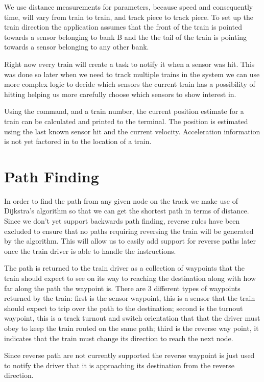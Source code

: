 \documentclass[pdftex,10pt,a4paper]{article}
\begin{document}
We use distance measurements for parameters, because speed and
consequently time, will vary from train to train, and track piece to
track piece. To set up the train direction the application assumes that
the front of the train is pointed towards a sensor belonging to bank B
and the the tail of the train is pointing towards a sensor belonging to
any other bank.

Right now every train will create a task to notify it when a sensor was hit.
This was done so later when we need to track multiple trains in the system we
can use more complex logic to decide which sensors the current train has a
possibility of hitting helping us more carefully choose which sensors to show
interest in.

Using the  command, and a train number, the current position
estimate for a train can be calculated and printed to the terminal. The
position is estimated using the last known sensor hit and the current
velocity. Acceleration information is not yet factored in to the
location of a train.

\section*{Path Finding}

In order to find the path from any given node on the track we make use of
Dijkstra's algorithm so that we can get the shortest path in terms of distance.
Since we don't yet support backwards path finding, reverse rules have
been excluded to ensure that no paths requiring reversing the train
will be generated by the algorithm. This will allow us to easily add
support for reverse paths later once the train driver is able to
handle the instructions.

The path is returned to the train driver as a collection of waypoints that the
train should expect to see on its way to reaching the destination along with
how far along the path the waypoint is. There are 3 different types of
waypoints returned by the train: first is the sensor waypoint, this is a sensor
that the train should expect to trip over the path to the destination; second
is the turnout waypoint, this is a track turnout and switch orientation that
that the driver must obey to keep the train routed on the same path; third is
the reverse way point, it indicates that the train must change its direction to
reach the next node.

Since reverse path are not currently supported the reverse waypoint is just used
to notify the driver that it is approaching its destination from the reverse
direction.
\end{document}
